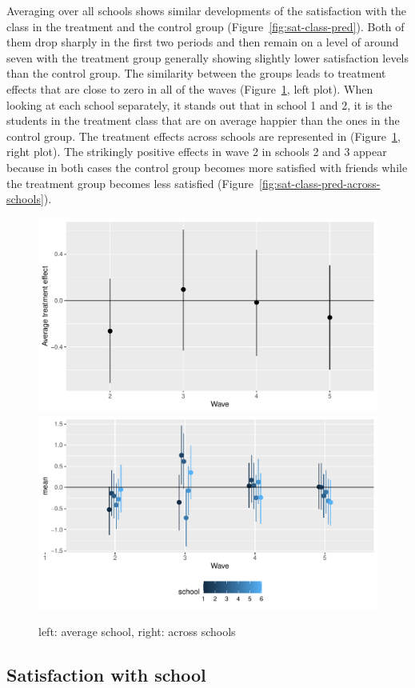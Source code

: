 \documentclass[a4, 12pt]{article}
\begin{document}
\label{sec:results-class}
Averaging over all schools shows similar developments of the satisfaction with the class in the treatment and the control group (Figure~\ref{fig:sat-class-pred}). Both of them drop sharply in the first two periods and then remain on a level of around seven with the treatment group generally showing slightly lower satisfaction levels than the control group. The similarity between the groups leads to treatment effects that are close to zero in all of the waves (Figure~\ref{fig:class}, left plot).
When looking at each school separately, it stands out that in school 1 and 2, it is the students in the treatment class that are on average happier than the ones in the control group. The treatment effects across schools are represented in (Figure~\ref{fig:class}, right plot). The strikingly positive effects in wave 2 in schools 2 and 3 appear because in both cases the control group becomes more satisfied with friends while the treatment group becomes less satisfied (Figure~\ref{fig:sat-class-pred-across-schools}).

\begin{figure}[H]
\includegraphics[width=0.5\linewidth,]{../figures/sat_class_teff} \includegraphics[width=0.5\linewidth,]{../figures/sat_class_teff_across_schools} \caption{left: average school, right: across schools}\label{fig:class}
\end{figure}

\hypertarget{satisfaction-with-school}{%
\subsection{Satisfaction with school}\label{satisfaction-with-school}}
\end{document}
